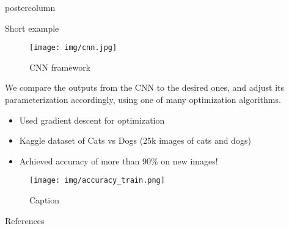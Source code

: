 \documentclass{beamer}
\begin{document}
\begin{frame}
\begin{columns}
\begin{column}{.57\textwidth}
\begin{beamercolorbox}[center]{postercolumn}
\begin{minipage}{.98\textwidth}
{\begin{myblock}{Short example}
					    \vspace{0.8cm}
					    \begin{figure}
					        \centering
					        \texttt{[image: img/cnn.jpg]}
					        \caption{CNN framework}
					        \label{fig:my_label}
					    \end{figure}

					    We compare the outputs from the CNN to the desired ones, and adjust its parameterization accordingly, using one of many optimization algorithms.
					    \vspace{0.8cm}
					    \begin{itemize}
					        \item Used gradient descent\cite{Paivi} for optimization
					        \item Kaggle dataset of Cats vs Dogs \cite{Oegren2008} (25k images of cats and dogs)
					        \item Achieved accuracy of more than 90\% on new images!
					    \end{itemize}

					    \begin{figure}
					        \centering
					        \texttt{[image: img/accuracy\_train.png]}
					        \caption{Caption}
					        \label{fig:my_label}
					    \end{figure}

					\end{myblock}
					\begin{myblock}{References}
						\footnotesize
						
						
					\end{myblock}\vfill
		}\end{minipage}\end{beamercolorbox}
	\end{column}
\end{columns}
\end{frame}
\end{document}
